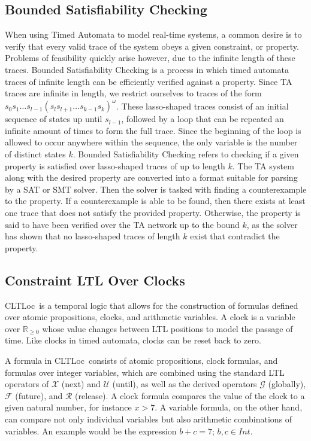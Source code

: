 \documentclass[a4paper,12pt]{article}
\newcommand{\cltloc}{CLTLoc}
\begin{document}
\subsection{Bounded Satisfiability Checking}\label{bounded-sat}

When using Timed Automata to model real-time systems, a common desire is to
verify that every valid trace of the system obeys a given constraint, or
property. Problems of feasibility quickly arise however, due to the infinite
length of these traces. Bounded Satisfiability Checking is a process in which
timed automata traces of infinite length can be efficiently verified against a
property. Since TA traces are infinite in
length, we restrict ourselves to traces of the form
\(s_0 s_1\ldots s_{l-1}{(s_l s_{l+1}\ldots s_{k-1}s_k)}^\omega\). These
lasso-shaped traces consist of an initial sequence of states up until
\(s_{l-1}\), followed by a loop that can be repeated an infinite amount of times
to form the full trace. Since the beginning of the loop is allowed to occur
anywhere within the sequence, the only variable is the number of distinct states
\(k\). Bounded Satisfiability Checking refers to checking if a given property is
satisfied over lasso-shaped traces of up to length \(k\).
The TA system along with the desired property are converted into a
format suitable for parsing by a SAT or SMT solver. Then the solver is tasked
with finding a counterexample to the property. If a counterexample is able to be
found, then there exists at least one trace that does not satisfy the provided
property. Otherwise, the property is said to have been verified over the TA
network up to the bound \(k\), as the solver has shown that no lasso-shaped
traces of length \(k\) exist that contradict the property.

\subsection{Constraint LTL Over Clocks}\label{cltloc}

\cltloc\ is a temporal logic that allows for the construction of formulas
defined over atomic propositions, clocks, and arithmetic variables. A clock is a
variable over \(\mathbb{R}_{\geq 0}\) whose value changes between LTL positions
to model the passage of time. Like clocks in timed automata, clocks can be
reset back to zero.

A formula in \cltloc\ consists of atomic propositions, clock formulas, and
formulas over integer variables, which are combined using the standard LTL
operators of \(\mathcal{X}\) (next) and \(\mathcal{U}\) (until), as well as the
derived operators \(\mathcal{G}\) (globally), \(\mathcal{F}\) (future), and
\(\mathcal{R}\) (release). A clock formula compares the value of the clock to a
given natural number, for instance \(x > 7\). A variable formula, on the other
hand, can compare not only individual variables but also arithmetic combinations
of variables. An example would be the expression \(b + c = 7\); \(b,c \in Int\).
\end{document}
